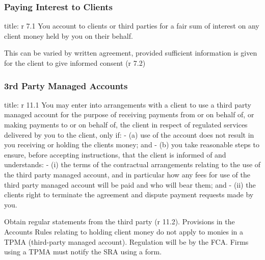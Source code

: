 \documentclass[
]{article}
\newenvironment{Shaded}{}{}
\newcommand{\NormalTok}[1]{#1}
\begin{document}
\hypertarget{paying-interest-to-clients}{%
\subsubsection{Paying Interest to
Clients}\label{paying-interest-to-clients}}

\begin{Shaded}
\begin{Highlighting}[]
\NormalTok{title: r 7.1}
\NormalTok{You account to clients or third parties for a fair sum of interest on any client money held by you on their behalf.}
\end{Highlighting}
\end{Shaded}

This can be varied by written agreement, provided sufficient information
is given for the client to give informed consent (r 7.2)

\hypertarget{rd-party-managed-accounts}{%
\subsubsection{3rd Party Managed
Accounts}\label{rd-party-managed-accounts}}

\begin{Shaded}
\begin{Highlighting}[]
\NormalTok{title: r 11.1}
\NormalTok{You may enter into arrangements with a client to use a third party managed account for the purpose of receiving payments from or on behalf of, or making payments to or on behalf of, the client in respect of regulated services delivered by you to the client, only if:}
\NormalTok{{-} (a) use of the account does not result in you receiving or holding the client\textquotesingle{}s money; and}
\NormalTok{{-} (b) you take reasonable steps to ensure, before accepting instructions, that the client is informed of and understands:}
\NormalTok{    {-} (i) the terms of the contractual arrangements relating to the use of the third party managed account, and in particular how any fees for use of the third party managed account will be paid and who will bear them; and}
\NormalTok{    {-} (ii) the client\textquotesingle{}s right to terminate the agreement and dispute payment requests made by you.}
\end{Highlighting}
\end{Shaded}

Obtain regular statements from the third party (r 11.2). Provisions in
the Accounts Rules relating to holding client money do not apply to
monies in a TPMA (third-party managed account). Regulation will be by
the FCA. Firms using a TPMA must notify the SRA using a form.
\end{document}
